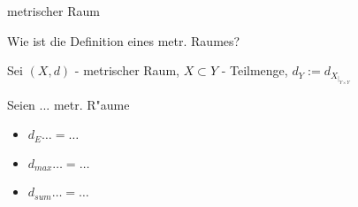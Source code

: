 \documentclass[class=article, crop=false]{standalone}
\begin{document}
\begin{zettel}{metrischer Raum}
\begin{flashcard}
\begin{question}
    Wie ist die Definition eines metr. Raumes?
\end{question}

    Sei $(X,d)$ - metrischer Raum, $X \subset Y$ - Teilmenge, $d_Y := d_{X_{|_{Y \times Y} } }  $ 

\end{flashcard}

Seien ... metr. R"aume
\begin{itemize}
    \item $d_E \dots  = \dots$ 
    \item $d_{max}  \dots  = \dots$ 
    \item $d_{sum}  \dots  = \dots$ 
\end{itemize}
\end{zettel}
\end{document}
